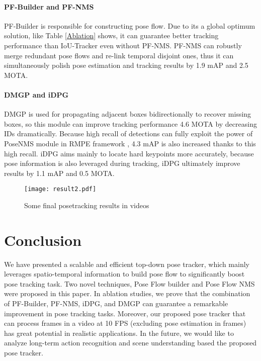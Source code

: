 \documentclass{bmvc2k}
\begin{document}
\paragraph{PF-Builder and PF-NMS} PF-Builder is responsible for constructing pose flow. Due to its a global optimum solution, like Table \ref{Ablation} shows, it can guarantee better tracking performance than IoU-Tracker even without PF-NMS. PF-NMS can robustly merge redundant pose flows and re-link temporal disjoint ones, thus it can simultaneously polish pose estimation and tracking results by 1.9 mAP and 2.5 MOTA.
\vspace{-3mm}
\paragraph{DMGP and iDPG} DMGP is used for propagating adjacent boxes bidirectionally to recover missing boxes, so this module can improve tracking performance 4.6 MOTA by decreasing IDs dramatically. Because high recall of detections can fully exploit the power of PoseNMS module in RMPE framework \cite{fang2017rmpe}, 4.3 mAP is also increased thanks to this high recall. iDPG aims mainly to locate hard keypoints more accurately, because pose information is also leveraged during tracking, iDPG ultimately improve results by 1.1 mAP and 0.5 MOTA. 
\vspace{-1mm}
\begin{figure*}[!ht]
\centering
\texttt{[image: result2.pdf]} 
\caption{Some final posetracking results in videos}
\label{fig:result}
\vspace{-2mm}
\end{figure*}

\section{Conclusion}
\vspace{-3mm}
We have presented a scalable and efficient top-down pose tracker, which mainly leverages spatio-temporal information to build pose flow to significantly boost pose tracking task. Two novel techniques, Pose Flow builder and Pose Flow NMS were proposed in this paper. In ablation studies, we prove that the combination of PF-Builder, PF-NMS, iDPG, and DMGP can guarantee a remarkable improvement in pose tracking tasks. Moreover, our proposed pose tracker that can process frames in a video at 10 FPS (excluding pose estimation in frames) has great potential in realistic applications. In the future, we would like to analyze long-term action recognition and scene understanding based the proposed pose tracker.

\clearpage
\newpage



\end{document}
